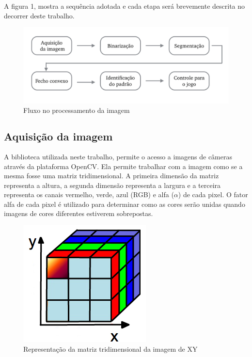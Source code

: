 \documentclass[12pt]{article}
\begin{document}
A figura 1, mostra a sequência adotada e cada etapa será brevemente descrita no decorrer deste trabalho.  

\begin{figure}[H]
\centering
\includegraphics[width=1\textwidth]{fluxo.png}
\caption{Fluxo no processamento da imagem} \label{fig1}
\end{figure}


\subsection{Aquisição da imagem}
A biblioteca utilizada neste trabalho\cite{hashimoto}, permite o acesso a imagens de câmeras através da plataforma OpenCV. Ela permite trabalhar com a imagem como se a mesma fosse uma matriz tridimensional. A primeira dimensão da matriz representa a altura, a segunda dimensão representa a largura e a terceira representa os canais vermelho, verde, azul (RGB) e alfa ($\alpha$) de cada pixel.  O fator alfa de cada pixel é utilizado para determinar como as cores serão unidas quando imagens de cores diferentes estiverem sobrepostas.

\begin{figure}[H]
\centering
\includegraphics[width=.60\textwidth]{base2.jpg}
\caption{Representação da matriz tridimensional da imagem de XY} \label{fig1}
\end{figure}
\end{document}
